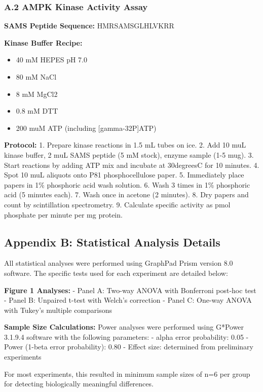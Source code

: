 \documentclass[11pt,a4paper]{article}
\begin{document}
\subsubsection*{A.2 AMPK Kinase Activity Assay}

\textbf{SAMS Peptide Sequence:} HMRSAMSGLHLVKRR

\textbf{Kinase Buffer Recipe:}
\begin{itemize}
\item 40 mM HEPES pH 7.0
\item 80 mM NaCl
\item 8 mM MgCl2
\item 0.8 mM DTT
\item 200 muM ATP (including [gamma-32P]ATP)
\end{itemize}

\textbf{Protocol:}
1. Prepare kinase reactions in 1.5 mL tubes on ice.
2. Add 10 muL kinase buffer, 2 muL SAMS peptide (5 mM stock), enzyme sample (1-5 mug).
3. Start reactions by adding ATP mix and incubate at 30degreesC for 10 minutes.
4. Spot 10 muL aliquots onto P81 phosphocellulose paper.
5. Immediately place papers in 1\% phosphoric acid wash solution.
6. Wash 3 times in 1\% phosphoric acid (5 minutes each).
7. Wash once in acetone (2 minutes).
8. Dry papers and count by scintillation spectrometry.
9. Calculate specific activity as pmol phosphate per minute per mg protein.

\subsection*{Appendix B: Statistical Analysis Details}

All statistical analyses were performed using GraphPad Prism version 8.0 software. The specific tests used for each experiment are detailed below:

\textbf{Figure 1 Analyses:}
- Panel A: Two-way ANOVA with Bonferroni post-hoc test
- Panel B: Unpaired t-test with Welch's correction
- Panel C: One-way ANOVA with Tukey's multiple comparisons

\textbf{Sample Size Calculations:}
Power analyses were performed using G*Power 3.1.9.4 software with the following parameters:
- alpha error probability: 0.05
- Power (1-beta error probability): 0.80
- Effect size: determined from preliminary experiments

For most experiments, this resulted in minimum sample sizes of n=6 per group for detecting biologically meaningful differences.
\end{document}
